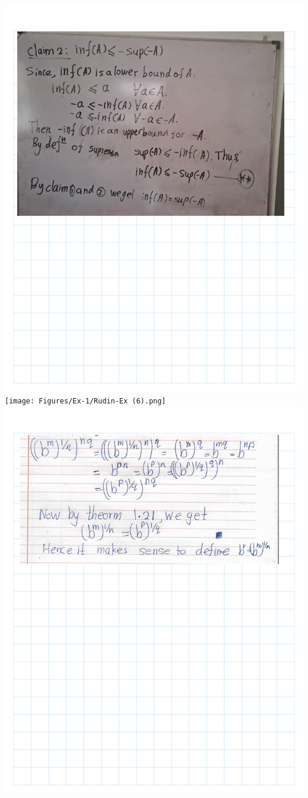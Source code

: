 \documentclass[
]{book}
\theoremstyle{definition}
\theoremstyle{definition}
\theoremstyle{definition}
\theoremstyle{definition}
\theoremstyle{remark}
\begin{document}
\includegraphics{Figures/Ex-1/Rudin-Ex (5).png}
\texttt{[image: Figures/Ex-1/Rudin-Ex (6).png]}
\includegraphics{Figures/Ex-1/Rudin-Ex (7).png}
\end{document}
